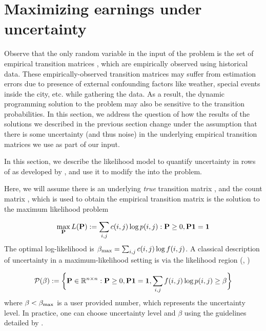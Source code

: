 

\section{Maximizing earnings under uncertainty}
\label{sec:sensitivity}
Observe that the only random variable in the input of the {\originalproblem} problem
is the set of empirical transition matrices {\empiricaltransitionmatrix}, which are empirically
observed using historical data. These empirically-observed transition matrices may suffer from estimation errors due to presence of external confounding factors like weather, special events inside the city, etc. while gathering the data. As a result, the dynamic programming solution to the {\originalproblem} problem
may also be sensitive to the transition probabilities. In this section, we
address the question of how the results of the solutions we described in the previous section change under the assumption that there is some uncertainty (and thus noise) in
the underlying empirical transition matrices we use as part of our input.

In this section, we describe the likelihood model to quantify uncertainty in rows of {\empiricaltransitionmatrix} as developed by \citet{nilim2004robustness}, and use it to modify the {\originalproblem} into the {\robustproblem} problem.


Here, we will assume there is an underlying \emph{true} transition matrix
{\truetransitionmatrix}, and the count matrix {\countmatrix}, which is used to 
obtain the empirical transition matrix {\empiricaltransitionmatrix} is the solution
to the maximum likelihood problem

\begin{equation}
\max_{\mathbf{P}} L({\mathbf{P}}) := \sum_{i,j}c(i,j) \log{p(i,j)} : {\mathbf{P}} \geq 0, {\mathbf{P}}\mathbf{1} = \mathbf{1} 
\end{equation}
The optimal log-likelihood is $\beta_{\textrm{max}}= \sum_{i,j}c(i,j)\log{f(i,j)}$.
A classical description of uncertainty in a maximum-likelihood setting is via the likelihood region (\citet{lehmann2006theory}, \citet{poor2013introduction})

\begin{equation*}
\mathcal{P}(\beta) := \bigg\{{\mathbf{P}} \in \mathbb{R}^{n \times n}: {\mathbf{P}} \geq 0, {\mathbf{P}} \mathbf{1}=\mathbf{1}, \sum_{i,j}f(i,j)\log{p(i,j)} \geq \beta\bigg\} \label{eq:likelihood_region}
\end{equation*}
where $\beta < \beta_{\textrm{max}}$ is a user provided number, which represents the uncertainty level. In practice, one can choose uncertainty level and $\beta$ using the guidelines detailed by \citet{nilim2004robustness}.

